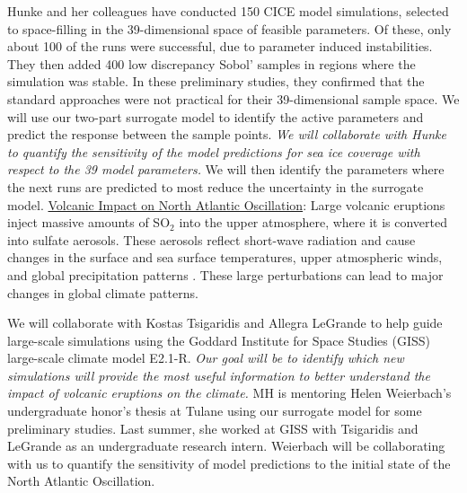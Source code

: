 \documentclass[11pt]{NSFamsart}
\newcommand{\Upara}[1]{\noindent\underline{\upshape #1}:}
\begin{document}
Hunke and her colleagues have conducted 150 CICE model simulations, selected to space-filling in the 39-dimensional space of feasible parameters. Of these, only about 100 of the runs were successful, due to parameter induced instabilities. They then added 400 low discrepancy Sobol' samples in regions where the simulation was stable. In these preliminary studies, they confirmed that the standard approaches \cite{bengio2006curse, o2010oxford} were not practical for their 39-dimensional sample space. We will use our two-part surrogate model to identify the active parameters \cite{constantine2014active} and predict the response between the sample points. 
\emph{We will collaborate with Hunke to quantify the sensitivity of the model predictions for sea ice coverage with respect to the 39 model parameters.} We will then identify the parameters where the next runs are predicted to most reduce the uncertainty in the surrogate model.
\Upara{Volcanic Impact on North Atlantic Oscillation}
Large volcanic eruptions inject massive amounts of SO${}_2$ into the upper atmosphere, where it is converted into sulfate aerosols. These aerosols reflect short-wave radiation and cause changes in the surface and sea surface temperatures, upper atmospheric winds, and global precipitation patterns \cite{zanchettin2013background, legrande2015volcanic,zanchettin2016model}. 
These large perturbations can lead to major changes in global climate patterns.

We will collaborate with Kostas Tsigaridis and Allegra LeGrande to help guide large-scale simulations using the Goddard Institute for Space Studies (GISS) large-scale climate model E2.1-R. \emph{Our goal will be to identify which new simulations will provide the most useful information to better understand the impact of volcanic eruptions on the climate.} MH is mentoring Helen Weierbach's undergraduate honor's thesis at Tulane using our surrogate model for some preliminary studies. Last summer, she worked at GISS with Tsigaridis and LeGrande as an undergraduate research intern. Weierbach will be collaborating with us to quantify the sensitivity of model predictions to the initial state of the North Atlantic Oscillation. 
\end{document}
